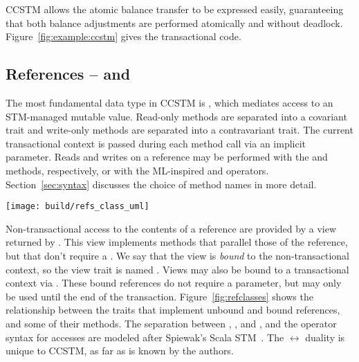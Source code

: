 CCSTM allows the atomic balance transfer to be expressed easily,
guaranteeing that both balance adjustments are performed atomically and
without deadlock.  Figure~\ref{fig:example:ccstm} gives the transactional
code.

\subsection{References --  and }

The most fundamental data type in CCSTM is , which mediates
access to an STM-managed mutable value.  Read-only methods are separated into a
covariant  trait and write-only methods are separated into a
contravariant  trait.  The current transactional context is passed
during
each method call via an implicit parameter.  Reads and writes on a
reference may be performed with the  and  methods,
respectively, or with the ML-inspired  and \code{:=}
operators.  Section~\ref{sec:syntax} discusses
the choice of method names in more detail.

\begin{figure*}
  \centering
  \texttt{[image: build/refs\_class\_uml]}

\caption{Traits that provide access to an STM-managed memory
location.  Transactional access can occur through either 
or a  returned from ,
non-transactional access occurs through a  returned
from .   and 
decompose the covariant and contravariant operations of .}

\label{fig:refclasses}
\end{figure*}






Non-transactional access to the contents of a reference are provided by a view
returned by .  This view implements methods that parallel those of
the reference, but that don't require a .  We say that the view
is \textit{bound} to the non-transactional context, so the view trait is
named .  Views may also be bound to a transactional context
via .  These bound references do not require a 
parameter, but may only be used until the end of the transaction.
Figure~\ref{fig:refclasses} shows the
 relationship between the traits that implement unbound
and bound references, and some of their methods.  The separation between
, , and , and the operator syntax for
accesses are modeled after Spiewak's Scala STM~\cite{github:spiewak}.
The  $ \leftrightarrow $  duality is unique
to CCSTM, as far as is known by the authors.

